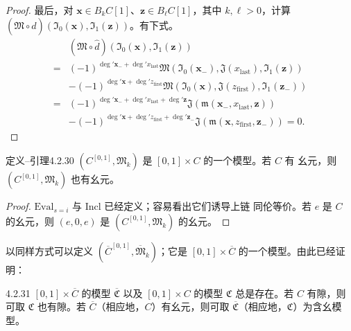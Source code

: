 \begin{proof}
最后，对 $\mathbf x\in B_kC[1]$、$\mathbf z\in B_\ell C[1]$，其中
$k,\ell>0$，计算
$(\mathfrak M\circ\widehat d)
(\mathfrak I_0(\mathbf x),\mathfrak I_1(\mathbf z))$。有下式。
{\small
\begin{equation}
\begin{aligned}
&(\mathfrak M\circ\widehat d)
 (\mathfrak I_0(\mathbf x),\mathfrak I_1(\mathbf z))\\
={}&(-1)^{\deg'\mathbf x_-+\deg'x_{\mathrm{last}}}
 \mathfrak M(\mathfrak I_0(\mathbf x_-),\mathfrak J(x_{\mathrm{last}}),
             \mathfrak I_1(\mathbf z))\\
&-(-1)^{\deg'\mathbf x+\deg'z_{\mathrm{first}}}
 \mathfrak M(\mathfrak I_0(\mathbf x),\mathfrak J(z_{\mathrm{first}}),
             \mathfrak I_1(\mathbf z_-))\\
={}&(-1)^{\deg'\mathbf x_-+\deg'x_{\mathrm{last}}+\deg'\mathbf z}
 \mathfrak J(\mathfrak m(\mathbf x_-,x_{\mathrm{last}},\mathbf z))\\
&-(-1)^{\deg'\mathbf x+\deg'z_{\mathrm{first}}+\deg'\mathbf z_-}
 \mathfrak J(\mathfrak m(\mathbf x,z_{\mathrm{first}},\mathbf z_-))=0.
\end{aligned}
\tag{4.2.29}\label{eq:4-2-29}
\end{equation}
}
\end{proof}

\begin{statement}{定义--引理}{4.2.30}\label{def-lem:4-2-30}
$(C^{[0,1]},\mathfrak M_k)$ 是 $[0,1]\times C$ 的一个模型。若 $C$ 有
幺元，则 $(C^{[0,1]},\mathfrak M_k)$ 也有幺元。
\end{statement}

\begin{proof}
$\mathrm{Eval}_{s=i}$ 与 $\mathrm{Incl}$ 已经定义；容易看出它们诱导上链
同伦等价。若 $e$ 是 $C$ 的幺元，则 $(e,0,e)$ 是
$(C^{[0,1]},\mathfrak M_k)$ 的幺元。
\end{proof}

以同样方式可以定义
$(\overline C^{[0,1]},\overline{\mathfrak M}_k)$；它是
$[0,1]\times\overline C$ 的一个模型。由此已经证明：

\begin{theorem}{4.2.31}\label{thm:4-2-31}
$[0,1]\times\overline C$ 的模型 $\overline{\mathfrak C}$ 以及
$[0,1]\times C$ 的模型 $\mathfrak C$ 总是存在。若 $C$ 有隙，则可取
$\mathfrak C$ 也有隙。若 $\overline C$（相应地，$C$）有幺元，则可取
$\overline{\mathfrak C}$（相应地，$\mathfrak C$）为含幺模型。
\end{theorem}

